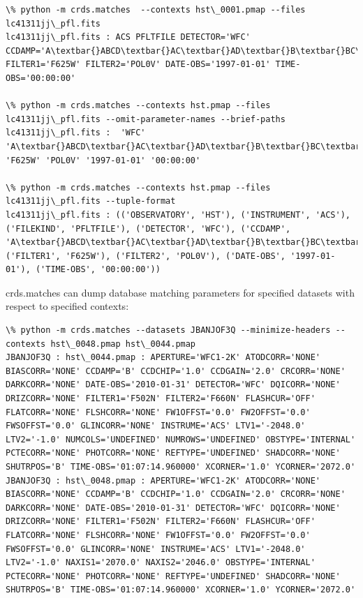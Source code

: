 \documentclass[letterpaper,10pt,english]{sphinxmanual}
\begin{document}
\begin{Verbatim}[commandchars=\\\{\}]
\% python -m crds.matches  --contexts hst\_0001.pmap --files lc41311jj\_pfl.fits
lc41311jj\_pfl.fits : ACS PFLTFILE DETECTOR='WFC' CCDAMP='A\textbar{}ABCD\textbar{}AC\textbar{}AD\textbar{}B\textbar{}BC\textbar{}BD\textbar{}C\textbar{}D' FILTER1='F625W' FILTER2='POL0V' DATE-OBS='1997-01-01' TIME-OBS='00:00:00'

\% python -m crds.matches --contexts hst.pmap --files lc41311jj\_pfl.fits --omit-parameter-names --brief-paths
lc41311jj\_pfl.fits :  'WFC' 'A\textbar{}ABCD\textbar{}AC\textbar{}AD\textbar{}B\textbar{}BC\textbar{}BD\textbar{}C\textbar{}D' 'F625W' 'POL0V' '1997-01-01' '00:00:00'

\% python -m crds.matches --contexts hst.pmap --files lc41311jj\_pfl.fits --tuple-format
lc41311jj\_pfl.fits : (('OBSERVATORY', 'HST'), ('INSTRUMENT', 'ACS'), ('FILEKIND', 'PFLTFILE'), ('DETECTOR', 'WFC'), ('CCDAMP', 'A\textbar{}ABCD\textbar{}AC\textbar{}AD\textbar{}B\textbar{}BC\textbar{}BD\textbar{}C\textbar{}D'), ('FILTER1', 'F625W'), ('FILTER2', 'POL0V'), ('DATE-OBS', '1997-01-01'), ('TIME-OBS', '00:00:00'))
\end{Verbatim}

crds.matches can dump database matching parameters for specified datasets with respect to specified contexts:

\begin{Verbatim}[commandchars=\\\{\}]
\% python -m crds.matches --datasets JBANJOF3Q --minimize-headers --contexts hst\_0048.pmap hst\_0044.pmap
JBANJOF3Q : hst\_0044.pmap : APERTURE='WFC1-2K' ATODCORR='NONE' BIASCORR='NONE' CCDAMP='B' CCDCHIP='1.0' CCDGAIN='2.0' CRCORR='NONE' DARKCORR='NONE' DATE-OBS='2010-01-31' DETECTOR='WFC' DQICORR='NONE' DRIZCORR='NONE' FILTER1='F502N' FILTER2='F660N' FLASHCUR='OFF' FLATCORR='NONE' FLSHCORR='NONE' FW1OFFST='0.0' FW2OFFST='0.0' FWSOFFST='0.0' GLINCORR='NONE' INSTRUME='ACS' LTV1='-2048.0' LTV2='-1.0' NUMCOLS='UNDEFINED' NUMROWS='UNDEFINED' OBSTYPE='INTERNAL' PCTECORR='NONE' PHOTCORR='NONE' REFTYPE='UNDEFINED' SHADCORR='NONE' SHUTRPOS='B' TIME-OBS='01:07:14.960000' XCORNER='1.0' YCORNER='2072.0'
JBANJOF3Q : hst\_0048.pmap : APERTURE='WFC1-2K' ATODCORR='NONE' BIASCORR='NONE' CCDAMP='B' CCDCHIP='1.0' CCDGAIN='2.0' CRCORR='NONE' DARKCORR='NONE' DATE-OBS='2010-01-31' DETECTOR='WFC' DQICORR='NONE' DRIZCORR='NONE' FILTER1='F502N' FILTER2='F660N' FLASHCUR='OFF' FLATCORR='NONE' FLSHCORR='NONE' FW1OFFST='0.0' FW2OFFST='0.0' FWSOFFST='0.0' GLINCORR='NONE' INSTRUME='ACS' LTV1='-2048.0' LTV2='-1.0' NAXIS1='2070.0' NAXIS2='2046.0' OBSTYPE='INTERNAL' PCTECORR='NONE' PHOTCORR='NONE' REFTYPE='UNDEFINED' SHADCORR='NONE' SHUTRPOS='B' TIME-OBS='01:07:14.960000' XCORNER='1.0' YCORNER='2072.0'
\end{Verbatim}
\end{document}
